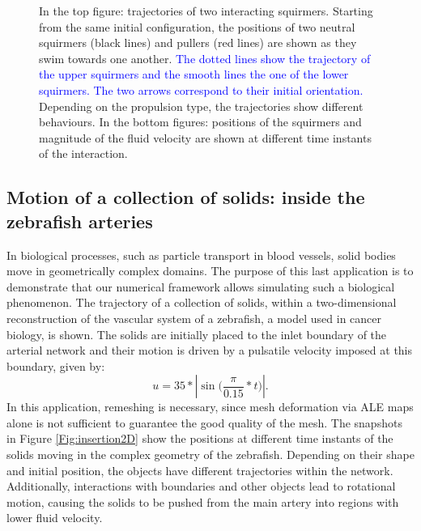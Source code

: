 \documentclass[graybox]{svmult}
\newcommand{\review}[1]{\textcolor{blue}{#1}}
\begin{document}
\begin{figure}
	\caption{In the top figure: trajectories of two interacting squirmers. Starting from the same initial configuration, the positions of two neutral squirmers (black lines) and pullers (red lines) are shown as they swim towards one another. \review{The dotted lines show the trajectory of the upper squirmers and the smooth lines the one of the lower squirmers. The two arrows correspond to their initial orientation.} Depending on the propulsion type, the trajectories show different behaviours.
 In the bottom figures: positions of the squirmers and magnitude of the fluid velocity are shown at different time instants of the interaction.}
	\label{Fig:squirmers}
\end{figure}


\subsection{Motion of a collection of solids: inside the zebrafish arteries}

\color{blue}
In biological processes, such as particle transport in blood vessels, solid bodies move in geometrically complex domains. The purpose of this last application is to demonstrate that our numerical framework allows simulating such a biological phenomenon. The trajectory of a collection of solids, within a two-dimensional reconstruction of the vascular system of a zebrafish, a model used in cancer biology, is shown. 
\color{black}
The solids are initially placed to the inlet boundary of the arterial network and their motion is driven by a pulsatile velocity imposed at this boundary, given by:  
$$
u = 35 * |\sin \bigl( \frac{\pi}{0.15}*t \bigr) |.
$$ 
In this application, remeshing %
is necessary, since mesh deformation via ALE maps alone is not sufficient to guarantee the good quality of the mesh.
The snapshots in Figure \ref{Fig:insertion2D} show the positions at different time instants of the solids moving in the complex geometry of the zebrafish. Depending on their shape and initial position, the objects have different trajectories within the network. Additionally, interactions with boundaries and other objects lead to rotational motion, causing the solids to be pushed from the main artery into regions with lower fluid velocity.


\end{document}
